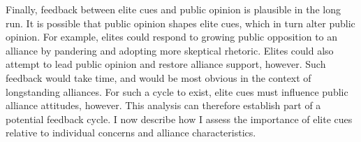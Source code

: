 \documentclass[12pt]{article}
\begin{document}
%
%
%
%
%



Finally, feedback between elite cues and public opinion is plausible in the long run. 
It is possible that public opinion shapes elite cues, which in turn alter public opinion. 
For example, elites could respond to growing public opposition to an alliance by pandering and adopting more skeptical rhetoric. 
Elites could also attempt to lead public opinion and restore alliance support, however.
Such feedback would take time, and would be most obvious in the context of longstanding alliances.
For such a cycle to exist, elite cues must influence public alliance attitudes, however.
This analysis can therefore establish part of a potential feedback cycle. 
I now describe how I assess the importance of elite cues relative to individual concerns and alliance characteristics. 
\end{document}
